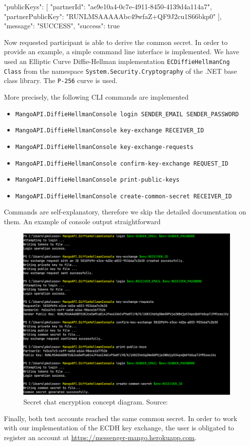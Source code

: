 \begin{spverbatim}
{
    "publicKeys": [
        {
            "partnerId": "ae9e10a4-0c7e-4911-8450-4139d4a114a7",
            "partnerPublicKey": "RUNLMSAAAAAbc49wfaZ+QF9J2cu1S66bkp0"
        }
    ],
    "message": "SUCCESS",
    "success": true
}
\end{spverbatim}
Now requested participant is able to derive the common secret.
In order to provide an example, a simple command line interface is implemented.
We have used an Elliptic Curve Diffie-Hellman implementation \texttt{ECDiffieHellmanCng Class} from the namespace
\texttt{System.Security.Cryptography} of the .NET base class library.
The \texttt{P-256} curve is used.

More precisely, the following CLI commands are implemented
\begin{itemize}
    \item \texttt{MangoAPI.DiffieHellmanConsole login SENDER\_EMAIL SENDER\_PASSWORD}
    \item \texttt{MangoAPI.DiffieHellmanConsole key-exchange RECEIVER\_ID}
    \item \texttt{MangoAPI.DiffieHellmanConsole key-exchange-requests}
    \item \texttt{MangoAPI.DiffieHellmanConsole confirm-key-exchange REQUEST\_ID}
    \item \texttt{MangoAPI.DiffieHellmanConsole print-public-keys}
    \item \texttt{MangoAPI.DiffieHellmanConsole create-common-secret RECEIVER\_ID}
\end{itemize}
Commands are self-explanatory, therefore we skip the detailed documentation on them.
An example of console output straightforward
\begin{figure}[H]
    \centering
    \includegraphics[width=1\textwidth]{Pictures/KeyExhangeConsole2}
    \caption{Secret chat encryption concept diagram. Source: }\label{fig:figure7}
\end{figure}
Finally, both test accounts reached the same common secret.
In order to work with our implementation of the ECDH key exchange, the user is obligated to register an account
at \href{messenger-mango.herokuapp.com}{https://messenger-mango.herokuapp.com}.